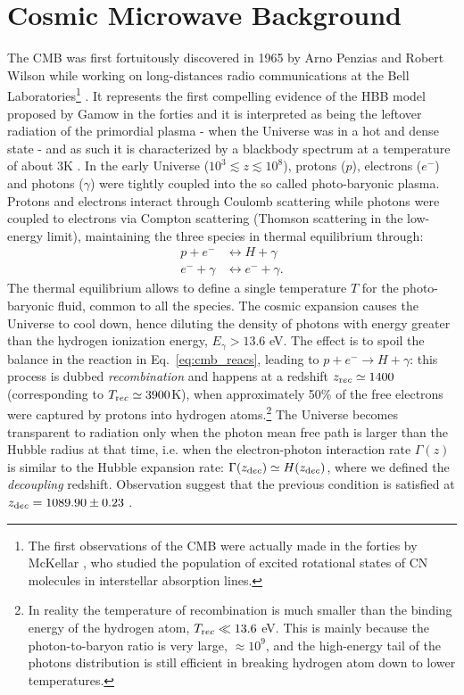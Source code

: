 \section{Cosmic Microwave Background}
\label{sec:cmb}
The \gls{CMB} was first fortuitously discovered in 1965 by Arno Penzias and Robert
Wilson while working on long-distances radio communications at the Bell Laboratories\footnote{The first 
observations of the \gls{CMB} were actually made in the forties by McKellar \citep{McKellar1940}, who studied the population of excited rotational states of CN molecules in interstellar absorption lines.} 
\citep{Penzias1965}. It represents the first compelling evidence of the \gls{HBB} model proposed by 
Gamow in the forties \citep{Gamow1946} and it is interpreted as being the leftover radiation of the 
primordial plasma - when the Universe was in a hot and dense state - and as such it is characterized  
by a blackbody spectrum at a temperature of about 3K . 
In the early Universe ($10^3 \lesssim z \lesssim 10^8$), protons ($p$), electrons 
($e^-$) and photons ($\gamma$) were tightly coupled into the so called photo-baryonic plasma.
Protons and electrons interact through Coulomb scattering while photons were coupled to electrons via
Compton scattering (Thomson scattering in the low-energy limit), maintaining the three species in thermal
equilibrium through:
%
\begin{align}
\label{eq:cmb_reacs}
p+e^- &\leftrightarrow H+\gamma \\
e^- + \gamma &\leftrightarrow e^- + \gamma.
\end{align}
% 
The thermal equilibrium allows to define a single temperature $T$ for the photo-baryonic fluid, common 
to all the species. The cosmic  expansion causes the Universe to cool down, hence diluting the 
density of photons with energy greater than the hydrogen ionization energy, $E_{\gamma} > 13.6$ eV. 
The effect is to spoil the balance in the reaction in Eq.~\eqref{eq:cmb_reacs}, leading to $p+e^-\to H+\gamma$: this process is dubbed \emph{recombination} and happens at a redshift $z_{\rm rec} \simeq 1400$ (corresponding to $T_{\rm rec} \simeq 3900$K), when approximately 50\% of the free electrons 
were captured by protons into hydrogen atoms.\footnote{In reality the temperature of recombination is 
much smaller than the binding energy of the hydrogen atom, $T_{\rm rec} \ll 13.6$ eV. This is mainly because
the photon-to-baryon ratio is very large, $\approx 10^9$, and the high-energy tail of the photons 
distribution is still efficient in breaking hydrogen atom down to lower temperatures.} The Universe 
becomes transparent to radiation only when the photon mean free path is larger than the Hubble radius 
at that time, i.e. when the electron-photon interaction rate $\Gamma(z)$ is similar to the Hubble 
expansion rate: $\Gamma(z_{\rm dec}) \simeq H(z_{\rm dec})$, where we defined the \emph{decoupling}
redshift. Observation suggest that the previous condition is satisfied at $z_{\rm dec} = 1089.90\pm 0.23$ 
\citep{PlanckCollaboration2015b}.

